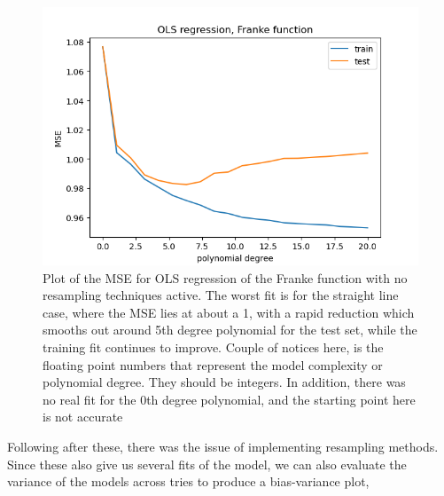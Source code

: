 \documentclass[15pt comic sans]{revtex4-2}
\begin{document}
\begin{figure}[hbtp]
\includegraphics[scale=0.7]{../plots/frankeOLSMSEsigma1maxdeg20.png}
\caption{Plot of the MSE for OLS regression of the Franke function with no resampling
	techniques active. The worst fit is for the straight line case, where the MSE lies
	at about a 1, with a rapid reduction which smooths out around 5th degree polynomial
	for the test set, while the training fit continues to improve. 
	Couple of notices here, is the floating point numbers that represent the model 
	complexity or polynomial degree. They should be integers. In addition, there was 
	no real fit for the 0th degree polynomial, and the starting point here is not 
	accurate}
\label{fig:MseNoResample}
\end{figure}

Following after these, there was the issue of implementing resampling methods. Since 
these also give us several fits of the model, we can also evaluate the variance of the
models across tries to produce a bias-variance plot,
\end{document}
